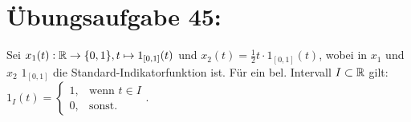 

	\section*{Übungsaufgabe 45:}
		Sei $x_1(t):{\mathbb R} \to \{0,1\}, t\mapsto 1_{[0,1]}(t)$  und $x_2(t) = \frac{1}{2}t\cdot 1_{[0,1]}(t)$, wobei in $x_1$ und $x_2$ $1_{[0,1]}$ die Standard-Indikatorfunktion ist. Für ein bel. Intervall $I\subset{\mathbb R}$  gilt: $1_{I}(t) = \begin{cases} 1, &\text{wenn } t\in I\\ 0, & \text{sonst.}\end{cases}$.
		
